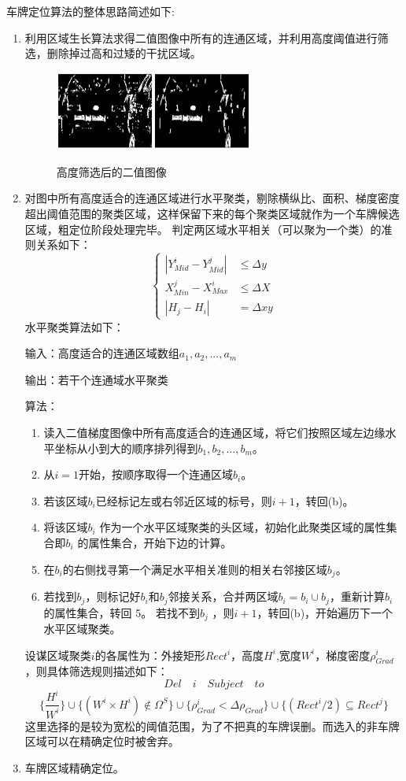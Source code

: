 车牌定位算法的整体思路简述如下:
\begin{enumerate}
\item
利用区域生长算法求得二值图像中所有的连通区域，并利用高度阈值进行筛选，删除掉过高和过矮的干扰区域。 
\begin{figure}[H]
    \centering 
    \includegraphics[width=0.618\textwidth]{image/2_5_1.jpg}    
    \label{logic}
    \caption{高度筛选后的二值图像}
\end{figure}
\item
对图中所有高度适合的连通区域进行水平聚类，剔除横纵比、面积、梯度密度超出阈值范围的聚类区域，这样保留下来的每个聚类区域就作为一个车牌候选区域，粗定位阶段处理完毕。 判定两区域水平相关（可以聚为一个类）的准则关系如下：
$$\left\{
\begin{aligned}
|Y^i_{Mid}-Y^j_{Mid}| & \leq \Delta y \\
X^j_{Min}-X^i_{Max} & \leq \Delta X\\
|H_j-H_i| & = \Delta xy
\end{aligned}
\right.
$$
水平聚类算法如下：

输入：高度适合的连通区域数组$a_1, a_2, ..., a_m$

输出：若干个连通域水平聚类

算法：
\begin{enumerate}
\item
读入二值梯度图像中所有高度适合的连通区域，将它们按照区域左边缘水平坐标从小到大的顺序排列得到$b_1, b_2, …, b_m$。
\item
从$i=1$开始，按顺序取得一个连通区域$b_i$。 
\item
若该区域$b_i$已经标记左或右邻近区域的标号，则$i+1$，转回(b)。 
\item
将该区域$b_i$ 作为一个水平区域聚类的头区域，初始化此聚类区域的属性集合即$b_i$ 的属性集合，开始下边的计算。  
\item
在$b_i$的右侧找寻第一个满足水平相关准则的相关右邻接区域$b_j$。  
\item
若找到$b_j$，则标记好$b_i$和$b_j$邻接关系，合并两区域$b_i=b_i \cup b_j$，重新计算$b_i$ 的属性集合，转回 5。 若找不到$b_j$ ，则$i+1$，转回(b)，开始遍历下一个水平区域聚类。  
\end{enumerate}
设谋区域聚类$i$的各属性为：外接矩形$Rect^i$，高度$H^i$,宽度$W^i$，梯度密度$\rho^i_{Grad}$，则具体筛选规则描述如下：
$$Del\quad i\quad Subject\quad to$$
$$\{\frac{H^i}{W^i}\}\cup\{(W^i\times H^i)\not \in \Omega^S\}
\cup \{\rho^i_{Grad}<\Delta \rho_{Grad}\}\cup \{(Rect^i/2)\subseteq Rect^j\}$$
这里选择的是较为宽松的阈值范围，为了不把真的车牌误删。而选入的非车牌区域可以在精确定位时被舍弃。
\item
车牌区域精确定位。


\end{enumerate}
